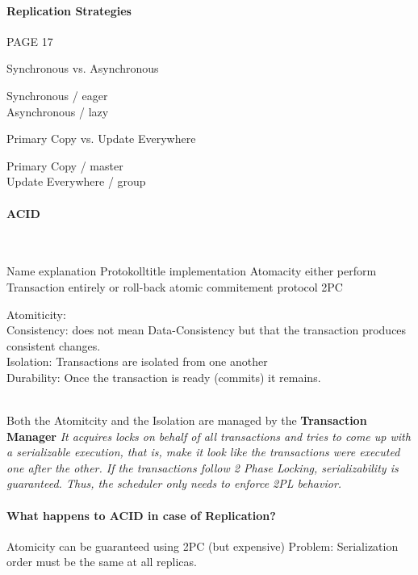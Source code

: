 \documentclass[a4paper,12pt]{article}%
\begin{document}
\paragraph{Replication Strategies}

PAGE 17

Synchronous vs. Asynchronous
\begin{description}
	\item[Synchronous / eager] 
	\item[Asynchronous / lazy] 
\end{description}

Primary Copy vs. Update Everywhere
\begin{description}
	\item[Primary Copy / master] 
	\item[Update Everywhere / group] 
\end{description}
\paragraph{ACID}~\\

\begin{table}
	
	Name 				explanation				Protokolltitle 		implementation
	Atomacity		either perform Transaction entirely or roll-back	atomic commitement protocol	2PC
	
	
	
\end{table}

Atomiticity: \\
Consistency: does not mean Data-Consistency but that the transaction produces consistent changes.\\
Isolation: Transactions are isolated from one another\\
Durability: Once the transaction is ready (commits) it remains.

~\\
Both the Atomitcity and the Isolation are managed by the {\bf Transaction Manager}
{\it It acquires locks on behalf of all transactions and tries to come up with a serializable execution, that is, make it look like the transactions were executed one after the other.
If the transactions follow 2 Phase Locking, serializability is guaranteed. Thus, the scheduler only needs to enforce 2PL behavior.}


\paragraph{What happens to ACID in case of Replication?}
Atomicity can be guaranteed using 2PC (but expensive)
Problem: Serialization order must be the same at all replicas.
\end{document}
